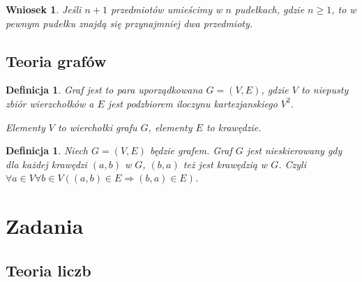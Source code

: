 \documentclass[12pt]{article}
\newcommand{\imp}{\Rightarrow}
\newtheorem{crl}[thm]{Wniosek}
\newtheorem{dfn}[thm]{Definicja}
\begin{document}
\begin{crl}
	Jeśli $n+1$ przedmiotów umieścimy w $n$ pudełkach, gdzie $n\geq 1$, 
	to w pewnym pudełku znajdą się przynajmniej dwa przedmioty.
\end{crl}

\subsection{Teoria grafów}

\begin{dfn}
	Graf jest to para uporządkowana $G=(V,E)$, gdzie $V$ to niepusty
	zbiór wierzchołków a $E$ jest podzbiorem iloczynu kartezjanskiego $V^2$.
	
    Elementy $V$ to wierchołki grafu $G$, elementy $E$ to krawędzie.
\end{dfn}

\begin{dfn}
	Niech $G=(V,E)$ będzie grafem. Graf $G$ jest nieskierowany
	gdy dla każdej krawędzi $(a,b)$ w $G$, $(b,a)$ też jest krawędzią w $G$. 
	Czyli $\forall a\in V\forall b\in V((a,b)\in E \imp (b,a)\in E)$. 
\end{dfn}

\section{Zadania}
\subsection{Teoria liczb}
\end{document}
